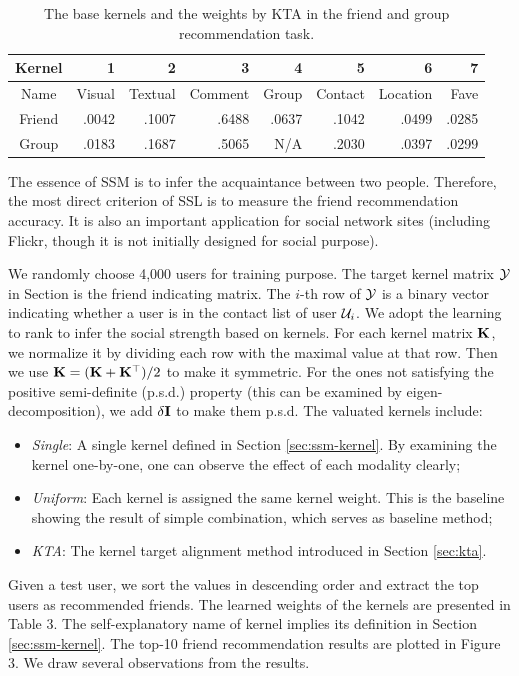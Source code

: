 \begin{table}[t]
\centering
\caption{The base kernels and the weights by KTA in the friend and group recommendation task.}
\begin{tabular}{|c|r|r|r|r|r|r|r|}
\hline
Kernel  &1 &2 &3 &4 &5 &6 &7\\
\hline
Name &Visual &Textual &Comment &Group &Contact &Location &Fave\\
\hline
\hline
Friend &.0042   &.1007  &.6488  &.0637  &.1042  &.0499  &.0285\\
Group &.0183    &.1687  &.5065  &N/A    &.2030  &.0397  &.0299\\
\hline
\end{tabular}
\end{table}

The essence of SSM is to infer the acquaintance between two people. Therefore, the most direct criterion of SSL is to measure the friend recommendation
accuracy. It is also an important application for social network sites (including Flickr, though it is not initially designed for social purpose).

We randomly choose 4,000 users for training purpose. The target kernel matrix ${\cal Y}$ in Section \label{sec:kta} is the friend indicating matrix. The $i$-th row of
${\cal Y}$ is a binary vector indicating whether a user is in the contact list of user ${\cal U}_i$. We adopt the learning to rank to infer the social strength based on
kernels. For each kernel matrix ${\mathbf K}$, we normalize it by dividing each row with the maximal value at that row. Then we use ${\mathbf K} = ({\mathbf K} + {\mathbf K}^\top) / 2$ to make it
symmetric. For the ones not satisfying the positive semi-definite (p.s.d.) property (this can be examined by eigen-decomposition), we add $\delta{\bf I}$ to make
them p.s.d. The valuated kernels include:
\begin{itemize}
  \item {\em Single}: A single kernel defined in Section \ref{sec:ssm-kernel}. By examining the kernel one-by-one, one can observe the effect of each modality
clearly;
  \item {\em Uniform}: Each kernel is assigned the same kernel weight. This is the baseline showing the result of simple combination, which serves as
baseline method;
  \item {\em KTA}: The kernel target alignment method introduced in Section \ref{sec:kta}.
\end{itemize}
Given a test user, we sort the values in descending order and extract the top users as recommended friends. The learned weights of the kernels are presented in Table 3. The self-explanatory name of kernel implies its definition in Section \ref{sec:ssm-kernel}. The top-10 friend recommendation results are plotted in Figure 3. We draw several observations from the results.

